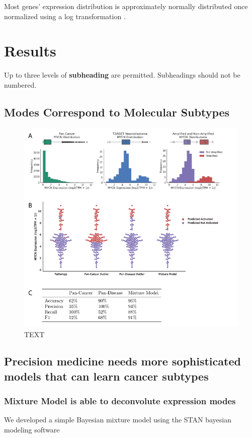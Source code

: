 \documentclass[fleqn,10pt]{wlscirep}
\begin{document}
Most genes' expression distribution is approximately normally distributed once normalized using a log transformation \cite{zwiener2014transforming}. 


\section*{Results}

Up to three levels of \textbf{subheading} are permitted. Subheadings should not be numbered.



\subsection*{Modes Correspond to Molecular Subtypes}

\begin{figure}
\centering
\includegraphics[width=1.05\linewidth]{images/MYCN-Figure.png}
\caption{TEXT}
\label{fig:mycn}
\end{figure}

\subsection*{Precision medicine needs more sophisticated models that can learn cancer subtypes}

\subsubsection*{Mixture Model is able to deconvolute expression modes}
We developed a simple Bayesian mixture model using the STAN bayesian modeling software \cite{stan}
\end{document}
